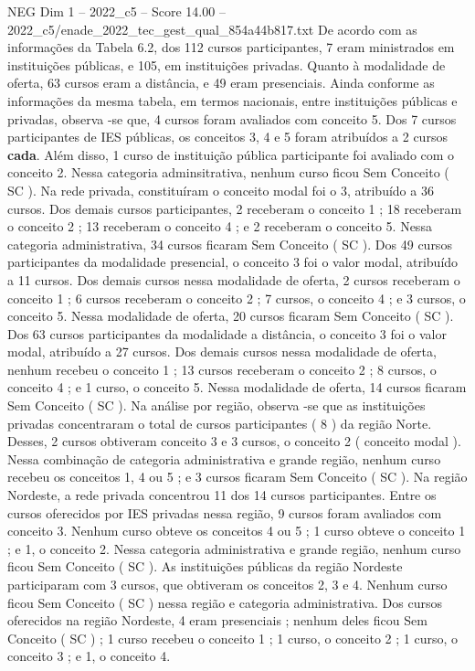 \begin{textsample}{NEG Dim 1 – 2022\_c5 – Score 14.00 – 2022\_c5/enade\_2022\_tec\_gest\_qual\_854a44b817.txt}
De acordo com as informações da Tabela 6.2, dos 112 cursos participantes, 7 eram ministrados em instituições públicas, e 105, em instituições privadas.
Quanto à modalidade de oferta, 63 cursos eram a distância, e 49 eram presenciais.
Ainda conforme as informações da mesma tabela, em termos nacionais, entre instituições públicas e privadas, observa -se que, 4 cursos foram avaliados com conceito 5.
Dos 7 cursos participantes de IES públicas, os conceitos 3, 4 e 5 foram atribuídos a 2 cursos \textbf{cada}.
Além disso, 1 curso de instituição pública participante foi avaliado com o conceito 2.
Nessa categoria adminsitrativa, nenhum curso ficou Sem Conceito ( SC ).
Na rede privada, constituíram o conceito modal foi o 3, atribuído a 36 cursos.
Dos demais cursos participantes, 2 receberam o conceito 1 ; 18 receberam o conceito 2 ; 13 receberam o conceito 4 ; e 2 receberam o conceito 5.
Nessa categoria administrativa, 34 cursos ficaram Sem Conceito ( SC ).
Dos 49 cursos participantes da modalidade presencial, o conceito 3 foi o valor modal, atribuído a 11 cursos.
Dos demais cursos nessa modalidade de oferta, 2 cursos receberam o conceito 1 ; 6 cursos receberam o conceito 2 ; 7 cursos, o conceito 4 ; e 3 cursos, o conceito 5.
Nessa modalidade de oferta, 20 cursos ficaram Sem Conceito ( SC ).
Dos 63 cursos participantes da modalidade a distância, o conceito 3 foi o valor modal, atribuído a 27 cursos.
Dos demais cursos nessa modalidade de oferta, nenhum recebeu o conceito 1 ; 13 cursos receberam o conceito 2 ; 8 cursos, o conceito 4 ; e 1 curso, o conceito 5.
Nessa modalidade de oferta, 14 cursos ficaram Sem Conceito ( SC ).
Na análise por região, observa -se que as instituições privadas concentraram o total de cursos participantes ( 8 ) da região Norte.
Desses, 2 cursos obtiveram conceito 3 e 3 cursos, o conceito 2 ( conceito modal ).
Nessa combinação de categoria administrativa e grande região, nenhum curso recebeu os conceitos 1, 4 ou 5 ; e 3 cursos ficaram Sem Conceito ( SC ).
Na região Nordeste, a rede privada concentrou 11 dos 14 cursos participantes.
Entre os cursos oferecidos por IES privadas nessa região, 9 cursos foram avaliados com conceito 3.
Nenhum curso obteve os conceitos 4 ou 5 ; 1 curso obteve o conceito 1 ; e 1, o conceito 2.
Nessa categoria administrativa e grande região, nenhum curso ficou Sem Conceito ( SC ).
As instituições públicas da região Nordeste participaram com 3 cursos, que obtiveram os conceitos 2, 3 e 4.
Nenhum curso ficou Sem Conceito ( SC ) nessa região e categoria administrativa.
Dos cursos oferecidos na região Nordeste, 4 eram presenciais ; nenhum deles ficou Sem Conceito ( SC ) ; 1 curso recebeu o conceito 1 ; 1 curso, o conceito 2 ; 1 curso, o conceito 3 ; e 1, o conceito 4.

\end{textsample}
